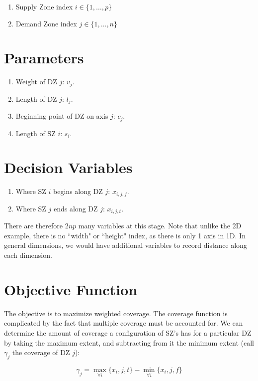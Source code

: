 \documentclass[a4paper]{article}
\begin{document}
\begin{enumerate}
    \item Supply Zone index $i \in \{1, \ldots, p\}$
    \item Demand Zone index $j \in \{1, \ldots, n\}$
\end{enumerate}

\section{Parameters}

\begin{enumerate}
    \item Weight of DZ $j$: $v_j$.
    \item Length of DZ $j$: $l_j$.
    \item Beginning point of DZ on axis $j$: $c_{j}$.
    \item Length of SZ $i$: $s_i$.
\end{enumerate}

\section{Decision Variables}

\begin{enumerate}
    \item Where SZ $i$ begins along DZ $j$: $x_{i,j,f}$.
    \item Where SZ $j$ ends along DZ $j$: $x_{i,j,t}$.
\end{enumerate}

There are therefore $2np$ many variables at this stage. Note that unlike the 2D example, there is no ``width" or ``height" index, as there is only 1 axis in 1D. In general dimensions, we would have additional variables to record distance along each dimension.

\section{Objective Function}

The objective is to maximize weighted coverage. The coverage function is complicated by the fact that multiple coverage must be accounted for. We can determine the amount of coverage a configuration of SZ's has for a particular DZ by taking the maximum extent, and subtracting from it the minimum extent (call $\gamma_j$ the coverage of DZ $j$):

$$
\gamma_j = \max_{\forall i}\{x_i,j,t\} - \min_{\forall i}\{x_i,j,f\}
$$
\end{document}
